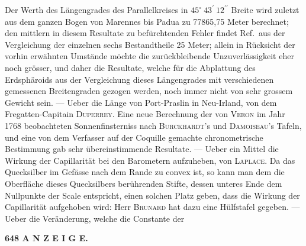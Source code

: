 \documentclass[12pt,a4paper]{article}
\begin{document}
Der Werth des L\"angengrades des Parallelkreises in $45^{\circ}\ 43^{\prime}\ 12^{\prime\prime}$ Breite wird zuletzt aus dem ganzen Bogen von Marennes bis Padua zu 77865,75 Meter berechnet; den mittlern in diesem Resultate zu bef\"urchtenden Fehler findet Ref.\ aus der Vergleichung der einzelnen sechs Bestandtheile 25 Meter; allein in R\"ucksicht der vorhin erw\"ahnten Umst\"ande m\"ochte die zur\"uckbleibende Unzuverl\"assigkeit eher noch gr\"osser, und daher die Resultate, welche f\"ur die Abplattung des Erdsph\"aroids aus der Vergleichung dieses L\"angengrades mit verschiedenen gemessenen Breitengraden gezogen werden, noch immer nicht von sehr grossem Gewicht sein. --- Ueber die L\"ange von Port-Praslin in Neu-Irland, von dem Fregatten-Capitain \textsc{Duperrey}. Eine neue Berechnung der von \textsc{Veron} im Jahr 1768 beobachteten Sonnenfinsterniss nach \textsc{Burckhardt}'s und \textsc{Damoiseau}'s Tafeln, und eine von dem Verfasser auf der Coquille gemachte chronometrische Bestimmung gab sehr \"ubereinstimmende Resultate. --- Ueber ein Mittel die Wirkung der Capillarit\"at bei den Barometern aufzuheben, von \textsc{Laplace}. Da das Quecksilber im Gef\"asse nach dem Rande zu convex ist, so kann man dem die Oberfl\"ache dieses Quecksilbers ber\"uhrenden Stifte, dessen unteres Ende dem Nullpunkte der Scale entspricht, einen solchen Platz geben, dass die Wirkung der Capillarit\"at aufgehoben wird: Herr \textsc{Brunard} hat dazu eine H\"ulfstafel gegeben. --- Ueber die Ver\"anderung, welche die Constante der

\begin{center}\small\textbf{648 A N Z E I G E.}\end{center}
\end{document}

